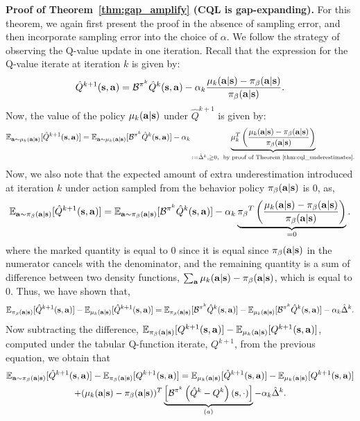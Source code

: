 \textbf{Proof of Theorem~\ref{thm:gap_amplify} (CQL is gap-expanding).} For this theorem, we again first present the proof in the absence of sampling error, and then incorporate sampling error into the choice of $\alpha$. We follow the strategy of observing the Q-value update in one iteration. Recall that the expression for the Q-value iterate at iteration $k$ is given by:
\begin{equation*}
    \hat{Q}^{k+1}(\mathbf{s}, \mathbf{a}) = \mathcal{B}^{\pi^k} \hat{Q}^{k}(\mathbf{s}, \mathbf{a}) - \alpha_k \frac{\mu_k(\mathbf{a}|\mathbf{s}) - {\pi_\beta}(\mathbf{a}|\mathbf{s})}{{\pi_\beta}(\mathbf{a}|\mathbf{s})}.
\end{equation*}
Now, the value of the policy $\mu_{k}(\mathbf{a}|\mathbf{s})$ under $\hat{Q}^{k+1}$ is given by:
\begin{equation*}
    \mathbb{E}_{\mathbf{a} \sim \mu_k(\mathbf{a}|\mathbf{s})}[\hat{Q}^{k+1}(\mathbf{s}, \mathbf{a})] = \mathbb{E}_{\mathbf{a} \sim \mu_k(\mathbf{a}|\mathbf{s})}[\mathcal{B}^{\pi^k} \hat{Q}^k (\mathbf{s}, \mathbf{a})] - \alpha_k \underbrace{\mu_k^T \left(\frac{\mu_k(\mathbf{a}|\mathbf{s}) - {\pi_\beta}(\mathbf{a}|\mathbf{s})}{{\pi_\beta}(\mathbf{a}|\mathbf{s})} \right)}_{:= \hat{\Delta}^k, \geq 0, \text{~~by proof of Theorem~\ref{thm:cql_underestimates}.}} 
\end{equation*}
Now, we also note that the expected amount of extra underestimation introduced at iteration $k$ under action sampled from the behavior policy ${\pi_\beta}(\mathbf{a}|\mathbf{s})$ is 0, as,
\begin{equation*}
    \mathbb{E}_{\mathbf{a} \sim {\pi_\beta}(\mathbf{a}|\mathbf{s})}[\hat{Q}^{k+1}(\mathbf{s}, \mathbf{a})] = \mathbb{E}_{\mathbf{a} \sim {\pi_\beta}(\mathbf{a}|\mathbf{s})}[\mathcal{B}^{\pi^k} \hat{Q}^k (\mathbf{s}, \mathbf{a})] - \alpha_k \underbrace{{\pi_\beta}^T \left(\frac{\mu_k(\mathbf{a}|\mathbf{s}) - {\pi_\beta}(\mathbf{a}|\mathbf{s})}{{\pi_\beta}(\mathbf{a}|\mathbf{s})} \right)}_{= 0}. 
\end{equation*}
where the marked quantity is equal to 0 since it is equal since ${\pi_\beta}(\mathbf{a}|\mathbf{s})$ in the numerator cancels with the denominator, and the remaining quantity is a sum of difference between two density functions, $\sum_{\mathbf{a}} \mu_k(\mathbf{a}|\mathbf{s}) - {\pi_\beta}(\mathbf{a}|\mathbf{s})$, which is equal to 0. Thus, we have shown that,
\begin{equation*}
    \mathbb{E}_{{\pi_\beta}(\mathbf{a}|\mathbf{s})}[\hat{Q}^{k+1}(\mathbf{s}, \mathbf{a})] - \mathbb{E}_{\mu_k(\mathbf{a}|\mathbf{s})}[\hat{Q}^{k+1}(\mathbf{s}, \mathbf{a})] = \mathbb{E}_{{\pi_\beta}(\mathbf{a}|\mathbf{s})}[\mathcal{B}^{\pi^k} \hat{Q}^k (\mathbf{s}, \mathbf{a})] - \mathbb{E}_{\mu_k(\mathbf{a}|\mathbf{s})}[\mathcal{B}^{\pi^k} \hat{Q}^k (\mathbf{s}, \mathbf{a})] - \alpha_k \hat{\Delta}^k.
\end{equation*}
Now subtracting the difference, $\mathbb{E}_{{\pi_\beta}(\mathbf{a}|\mathbf{s})}[Q^{k+1}(\mathbf{s}, \mathbf{a})] - \mathbb{E}_{\mu_k(\mathbf{a}|\mathbf{s})}[Q^{k+1}(\mathbf{s}, \mathbf{a})]$, computed under the tabular Q-function iterate, $Q^{k+1}$, from the previous equation, we obtain that
\begin{multline*}
    \mathbb{E}_{\mathbf{a} \sim {\pi_\beta}(\mathbf{a}|\mathbf{s})}[\hat{Q}^{k+1}(\mathbf{s}, \mathbf{a})] - \mathbb{E}_{{\pi_\beta}(\mathbf{a}|\mathbf{s})}[{Q}^{k+1}(\mathbf{s}, \mathbf{a})] = \mathbb{E}_{\mu_k(\mathbf{a}|\mathbf{s})}[\hat{Q}^{k+1}(\mathbf{s}, \mathbf{a})] - \mathbb{E}_{\mu_k(\mathbf{a}|\mathbf{s})}[{Q}^{k+1}(\mathbf{s}, \mathbf{a})]\\
    + (\mu_k(\mathbf{a}|\mathbf{s}) - {\pi_\beta}(\mathbf{a}|\mathbf{s}))^T \underbrace{\left[ \mathcal{B}^{\pi^k} \left( \hat{Q}^k - Q^k \right)(\mathbf{s}, \cdot) \right]}_{(a)}- \alpha_k \hat{\Delta}^k.
\end{multline*}

